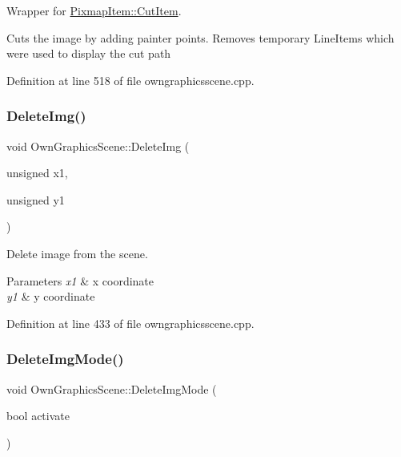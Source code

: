 Wrapper for \mbox{\hyperlink{classPixmapItem_a4a742318dce01d018da2f4b01790c210}{Pixmap\+Item\+::\+Cut\+Item}}. 

Cuts the image by adding painter points. Removes temporary Line\+Items which were used to display the cut path 

Definition at line 518 of file owngraphicsscene.\+cpp.

\mbox{\label{classOwnGraphicsScene_abda962c04f88920377d3bb23b30b9267}} 
\subsubsection{\texorpdfstring{Delete\+Img()}{DeleteImg()}}
{\footnotesize\ttfamily void Own\+Graphics\+Scene\+::\+Delete\+Img (\begin{DoxyParamCaption}\item[{unsigned}]{x1,  }\item[{unsigned}]{y1 }\end{DoxyParamCaption})}



Delete image from the scene. 


\begin{DoxyParams}{Parameters}
{\em x1} & x coordinate \\
\hline
{\em y1} & y coordinate \\
\hline
\end{DoxyParams}


Definition at line 433 of file owngraphicsscene.\+cpp.

\mbox{\label{classOwnGraphicsScene_aefe52a5b20dbb38dcc9d9510ecfabe52}} 
\subsubsection{\texorpdfstring{Delete\+Img\+Mode()}{DeleteImgMode()}}
{\footnotesize\ttfamily void Own\+Graphics\+Scene\+::\+Delete\+Img\+Mode (\begin{DoxyParamCaption}\item[{bool}]{activate }\end{DoxyParamCaption})}



